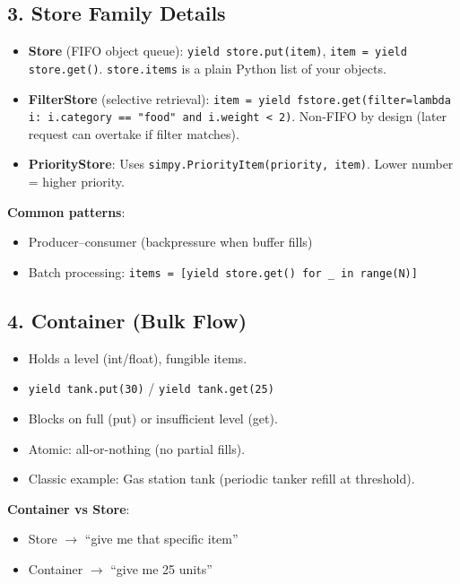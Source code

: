 \documentclass[11pt]{article}
\begin{document}
\subsection*{3. Store Family Details}
\begin{itemize}[leftmargin=*]
\item \textbf{Store} (FIFO object queue): \texttt{yield store.put(item)}, \texttt{item = yield store.get()}. \texttt{store.items} is a plain Python list of your objects.
\item \textbf{FilterStore} (selective retrieval): \texttt{item = yield fstore.get(filter=lambda i: i.category == "food" and i.weight < 2)}. Non-FIFO by design (later request can overtake if filter matches).
\item \textbf{PriorityStore}: Uses \texttt{simpy.PriorityItem(priority, item)}. Lower number = higher priority.
\end{itemize}

\textbf{Common patterns}:
\begin{itemize}[leftmargin=*]
\item Producer--consumer (backpressure when buffer fills)
\item Batch processing: \texttt{items = [yield store.get() for \_ in range(N)]}
\end{itemize}

\subsection*{4. Container (Bulk Flow)}
\begin{itemize}[leftmargin=*]
\item Holds a level (int/float), fungible items.
\item \texttt{yield tank.put(30)} / \texttt{yield tank.get(25)}
\item Blocks on full (put) or insufficient level (get).
\item Atomic: all-or-nothing (no partial fills).
\item Classic example: Gas station tank (periodic tanker refill at threshold).
\end{itemize}

\textbf{Container vs Store}:
\begin{itemize}[leftmargin=*]
\item Store $\rightarrow$ ``give me that specific item''
\item Container $\rightarrow$ ``give me 25 units''
\end{itemize}
\end{document}
